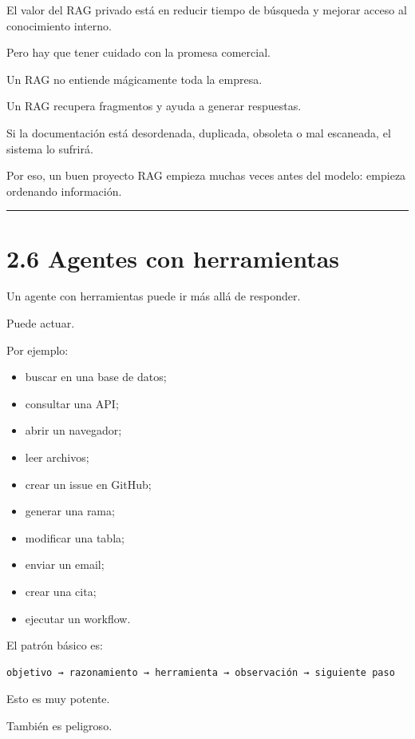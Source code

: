 El valor del RAG privado está en reducir tiempo de búsqueda y mejorar
acceso al conocimiento interno.

Pero hay que tener cuidado con la promesa comercial.

Un RAG no entiende mágicamente toda la empresa.

Un RAG recupera fragmentos y ayuda a generar respuestas.

Si la documentación está desordenada, duplicada, obsoleta o mal
escaneada, el sistema lo sufrirá.

Por eso, un buen proyecto RAG empieza muchas veces antes del modelo:
empieza ordenando información.

\begin{center}\rule{0.5\linewidth}{0.5pt}\end{center}

\section{2.6 Agentes con herramientas}\label{agentes-con-herramientas}

Un agente con herramientas puede ir más allá de responder.

Puede actuar.

Por ejemplo:

\begin{itemize}
\tightlist
\item
  buscar en una base de datos;
\item
  consultar una API;
\item
  abrir un navegador;
\item
  leer archivos;
\item
  crear un issue en GitHub;
\item
  generar una rama;
\item
  modificar una tabla;
\item
  enviar un email;
\item
  crear una cita;
\item
  ejecutar un workflow.
\end{itemize}

El patrón básico es:

\begin{lstlisting}
objetivo → razonamiento → herramienta → observación → siguiente paso
\end{lstlisting}

Esto es muy potente.

También es peligroso.

